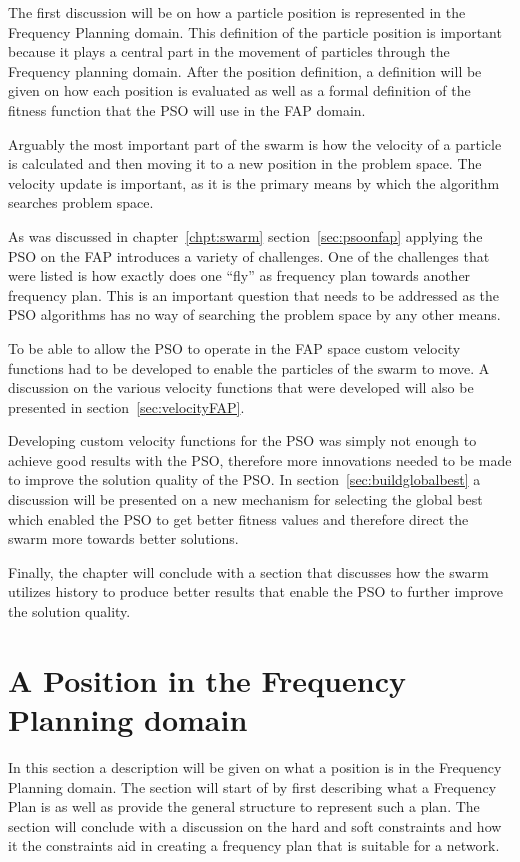 The first discussion will be on how a particle position is represented in the Frequency Planning domain. This definition of the particle position is important because it plays a central part in
the movement of particles through the Frequency planning domain. After the position definition, a definition will be given on how each position is evaluated as well as a formal definition of the fitness function that the PSO will use in the FAP domain.

Arguably the most important part of the swarm is how the velocity of a particle is calculated and then moving it to a new position in the problem space. The velocity update is important, as it is the primary means by which the algorithm searches problem space.

As was discussed in chapter~\ref{chpt:swarm} section~\ref{sec:psoonfap} applying the PSO on the FAP introduces a variety of challenges. One of the challenges that were listed is how exactly does one ``fly'' as frequency plan towards another frequency plan. This is an important question that needs to be addressed as the PSO algorithms has no way of searching the problem space by any other means.

To be able to allow the PSO to operate in the FAP space custom velocity functions had to be developed to enable the particles of the swarm to move. A discussion on the various velocity functions that were developed will also be presented in section~\ref{sec:velocityFAP}. 

Developing custom velocity functions for the PSO was simply not enough to achieve good results with the PSO, therefore more innovations needed to be made to improve the solution quality of the PSO. In section~\ref{sec:buildglobalbest} a discussion will be presented on a new mechanism for selecting the global best which enabled the PSO to get better fitness values and therefore direct the swarm more towards better solutions. 

Finally, the chapter will conclude with a section that discusses how the swarm utilizes history to produce better results that enable the PSO to further improve the solution quality.
\section{A Position in the Frequency Planning domain}
In this section a description will be given on what a position is in the Frequency Planning domain. The section will start of by first describing what a Frequency Plan is as well as provide the general structure to represent such a plan. The section will conclude with a discussion on the hard and soft constraints and how it the constraints aid in creating a frequency plan that is suitable for a network.

